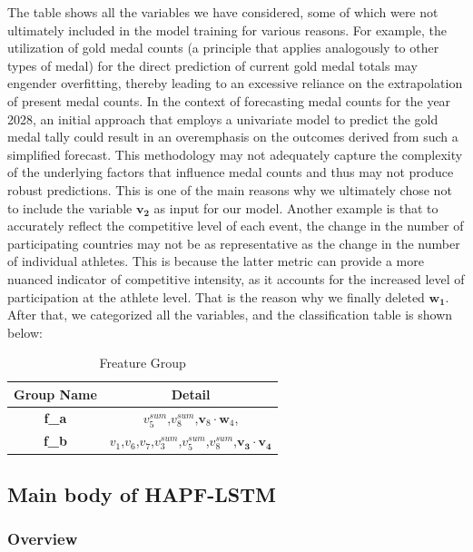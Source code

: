 \documentclass[12pt]{article}
\begin{document}
The table shows all the variables we have considered, some of which were not ultimately included in the model training for various reasons. For example, the utilization of gold medal counts (a principle that applies analogously to other types of medal) for the direct prediction of current gold medal totals may engender overfitting, thereby leading to an excessive reliance on the extrapolation of present medal counts. In the context of forecasting medal counts for the year 2028, an initial approach that employs a univariate model to predict the gold medal tally could result in an overemphasis on the outcomes derived from such a simplified forecast. This methodology may not adequately capture the complexity of the underlying factors that influence medal counts and thus may not produce robust predictions. This is one of the main reasons why we ultimately chose not to include the variable $ \bm{v_2} $ as input for our model. Another example is that to accurately reflect the competitive level of each event, the change in the number of participating countries may not be as representative as the change in the number of individual athletes. This is because the latter metric can provide a more nuanced indicator of competitive intensity, as it accounts for the increased level of participation at the athlete level. That is the reason why we finally deleted $ \bm{w_1} $.\\

After that, we categorized all the variables, and the classification table is shown below:

\begin{table}[h]
\caption{Freature Group}
\centering
\begin{tabular}{|c|c|}
\hline
\textbf{Group Name} & \textbf{Detail}\\\hline
\textbf{f\_a} & $v_5^{sum}$,$v_8^{sum}$,$ \bm{v}_8 \cdot \bm{w}_4 $, \\ \hline
\textbf{f\_b} & $v_1$,$v_6$,$v_7$,$v_3^{sum}$,$v_5^{sum}$,$v_8^{sum}$,$ \bm{v_3}\cdot \bm{v_4}$
\\ \hline
\end{tabular}
\label{tab:variable_descriptions}
\end{table}

\subsection{Main body of HAPF-LSTM}

\subsubsection{Overview}
\end{document}
